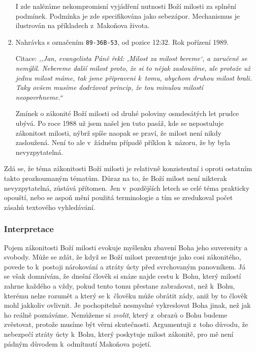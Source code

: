\begin{enumerate}
{    I zde nalézáme nekompromisní vyjádření nutnosti Boží milosti za splnění
    podmínek. Podmínka je zde specifikována jako sebezápor. Mechanismus je
    ilustrován na příkladech z~Makoňova života.
  }
  \item{
    Nahrávka s označením \texttt{89-36B-53}, od pozice 12:32.
    Rok pořízení 1989.

    Citace: \textit{%
      ,,Jan, evangelista Páně řekl: ,Milost za milost bereme`, a zaručeně se
      nemýlil. Nebereme další milost proto, že si to nějak zasloužíme, ale
      protože už jednu milost máme, tak jsme připraveni k~tomu, abychom druhou
      milost brali. Taky ovšem musíme dodržovat princip, že tou minulou milostí
      neopovrhneme.``
    }

    Zmínek o zákonité Boží milosti od druhé poloviny osmdesátých let prudce
    ubývá. Po roce 1988 už jsem našel jen tuto pasáž, kde se nepostuluje
    zákonitost milosti, nýbrž spíše naopak se praví, že milost není nikdy
    zasloužená. Není to ale v~žádném případě příklon k~názoru, že by byla
    nevyzpytatelná.
  }
\end{enumerate}

Zdá se, že téma zákonitosti Boží milosti je relativně konzistentní i oproti
ostatním takto prozkoumaným tématům. Důraz na to, že Boží milost není nikterak
nevyzpytatelná, zůstává přítomen. Jen v~pozdějších letech se celé téma prakticky
opouští, nebo se aspoň mění použitá terminologie a tím se zredukoval počet
zásahů textového vyhledávání.

\subsubsection*{Interpretace}

Pojem zákonitosti Boží milosti evokuje myšlenku zbavení Boha jeho suverenity a
svobody. Může se zdát, že když se Boží milost prezentuje jako cosi zákonitého,
povede to k~postoji nárokování a ztráty úcty před svrchovaným panovníkem. Já se
však domnívám, že dnešní člověk si snáze najde cestu k~Bohu, který milostí
zahrne každého a vždy, pokud tento tomu přestane zabraňovat, než k~Bohu, kterému
nelze rozumět a který se k~člověku může obrátit zády, aniž by to člověk mohl
jakkoliv ovlivnit. Je pochopitelně nesmyslné vykreslovat Boha jinak, než jak ho
reálně poznáváme. Nemůžeme si \textit{zvolit}, který z~obrazů o Bohu budeme
zvěstovat, protože musíme být věrni skutečnosti. Argumentuji z~toho důvodu, že
nebezpečí ztráty úcty k~Bohu, který poskytuje milost zákonitě, pro mě není
pádným důvodem k~odmítnutí Makoňova pojetí.

